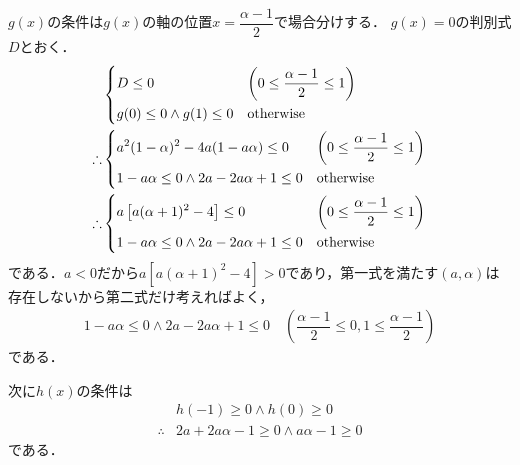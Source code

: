 \documentclass[../../main.tex]{subfiles}
\begin{document}
$g(x)$の条件は$g(x)$の軸の位置$x=\dfrac{\alpha-1}{2}$で場合分けする．
$g(x)=0$の判別式$D$とおく．
\begin{align}
  &
  \begin{dcases}
    D \le 0 & \left(0 \le \dfrac{\alpha-1}{2} \le 1\right) \\
    g(0) \le 0 \land g(1) \le 0 & \text{otherwise}
  \end{dcases} \\
  \therefore
  &
  \begin{dcases}
    a^2(1-\alpha)^2-4a(1-a\alpha)\le 0 & \left(0 \le \dfrac{\alpha-1}{2} \le 1\right) \\
    1-a\alpha \le 0 \land 2a-2a\alpha + 1 \le 0 & \text{otherwise}
  \end{dcases} \\
  \therefore
  &
  \begin{dcases}
    a\left[a(\alpha+1)^2-4\right] \le 0 & \left(0 \le \dfrac{\alpha-1}{2} \le 1\right) \\
    1-a\alpha \le 0 \land 2a-2a\alpha + 1 \le 0 & \text{otherwise}
  \end{dcases}
\end{align}
である．$a<0$だから$a\left[a(\alpha+1)^2-4\right]>0$であり，第一式を満たす$(a,\alpha)$は存在しないから第二式だけ考えればよく，
\begin{align}
  1-a\alpha \le 0 \land 2a-2a\alpha+1 \le 0 \quad \left(\dfrac{\alpha-1}{2} \le 0, 1 \le \dfrac{\alpha-1}{2}\right) \label{eq:6}
\end{align}
である．

次に$h(x)$の条件は
\begin{align}
  & h(-1) \ge 0 \land h(0) \ge 0 \\
  \therefore
  & 2a+2a\alpha-1\ge 0 \land a\alpha-1 \ge 0 \label{eq:7}
\end{align}
である．
\end{document}
